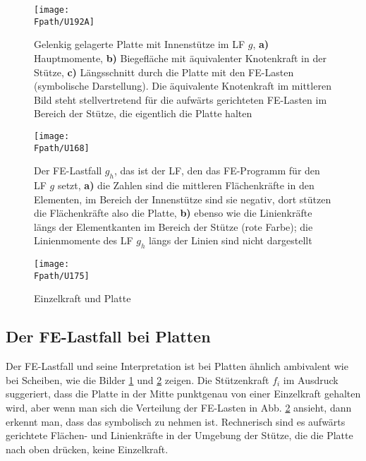 \begin{figure}
\centering
{\texttt{[image: \\Fpath/U192A]}}
  \caption{Gelenkig gelagerte Platte mit Innenst\"{u}tze im LF $g$, \textbf{ a)} Hauptmomente, \textbf{ b)} Biegefl\"{a}che mit \"{a}quivalenter Knotenkraft in der St\"{u}tze,  \textbf{ c)} L\"{a}ngsschnitt durch die Platte mit den FE-Lasten (symbolische Darstellung). Die \"{a}quivalente Knotenkraft im mittleren Bild steht stellvertretend f\"{u}r die aufw\"{a}rts gerichteten FE-Lasten im Bereich der St\"{u}tze, die eigentlich die Platte halten}
  \label{U192}
\end{figure}
\begin{figure}
\centering
{\texttt{[image: \\Fpath/U168]}}
  \caption{Der FE-Lastfall $g_h$, das ist der LF, den das FE-Programm f\"{u}r den LF $g$ setzt, \textbf{ a)} die Zahlen sind die mittleren Fl\"{a}chenkr\"{a}fte in den Elementen, im Bereich der Innenst\"{u}tze sind sie negativ, dort st\"{u}tzen die Fl\"{a}chenkr\"{a}fte also die Platte, \textbf{ b)} ebenso wie die Linienkr\"{a}fte l\"{a}ngs der Elementkanten im Bereich der St\"{u}tze (rote Farbe); die Linienmomente des LF $g_h$ l\"{a}ngs der Linien sind nicht dargestellt}
  \label{U168}
\end{figure}


\begin{figure}
\centering
\if {} \sidecaption[t] \fi
{\texttt{[image: \\Fpath/U175]}}
  \caption{Einzelkraft und Platte}
  \label{U175}
\end{figure}

{\textcolor{sectionTitleBlue}{\section{Der FE-Lastfall bei Platten}}}
Der FE-Lastfall und seine Interpretation ist bei Platten \"{a}hnlich ambivalent wie bei Scheiben, wie die Bilder \ref{U192} und \ref{U168} zeigen. Die St\"{u}tzenkraft $f_i$ im Ausdruck suggeriert, dass die Platte in der Mitte punktgenau von einer Einzelkraft gehalten wird, aber wenn man sich die Verteilung der FE-Lasten in Abb. \ref{U168} ansieht, dann erkennt man, dass das symbolisch zu nehmen ist. Rechnerisch sind es aufw\"{a}rts gerichtete Fl\"{a}chen- und Linienkr\"{a}fte in der Umgebung der St\"{u}tze, die die Platte nach oben dr\"{u}cken, keine Einzelkraft.

